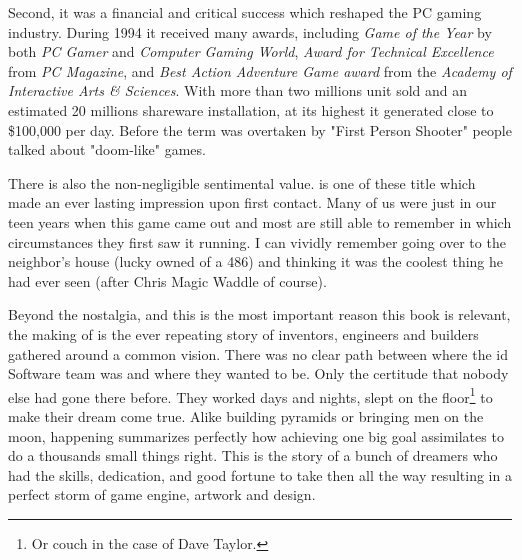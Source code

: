 Second, it was a financial and critical success which reshaped the PC gaming industry. During 1994 it received many awards, including \textit{Game of the Year} by both \textit{PC Gamer} and \textit{Computer Gaming World}, \textit{Award for Technical Excellence} from \textit{PC Magazine}, and \textit{Best Action Adventure Game award} from the \textit{Academy of Interactive Arts \& Sciences}. With more than two millions unit sold and an estimated 20 millions shareware installation, at its highest it generated close to \$100,000 per day. Before the term was overtaken by "First Person Shooter" people talked about "doom-like" games.\\
 \par
 \par
There is also the non-negligible sentimental value. \doom is one of these title which made an ever lasting impression upon first contact. Many of us were just in our teen years when this game came out and most are still able to remember in which circumstances they first saw it running. I can vividly remember going over to the neighbor's house (lucky owned of a 486) and thinking it was the coolest thing he had ever seen (after Chris Magic Waddle of course).\\
\par


Beyond the nostalgia, and this is the most important reason this book is relevant, the making of \doom is the ever repeating story of inventors, engineers and builders gathered around a common vision. There was no clear path between where the id Software team was and where they wanted to be. Only the certitude that nobody else had gone there before. They worked days and nights, slept on the floor\footnote{Or couch in the case of Dave Taylor.} to make their dream come true. Alike building pyramids or bringing men on the moon, \doom happening summarizes perfectly how achieving one big goal assimilates to do a thousands small things right. This is the story of a bunch of dreamers who had the skills, dedication, and good fortune to take then all the way resulting in a perfect storm of game engine, artwork and design.\\
\par



